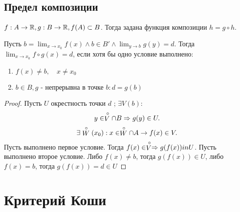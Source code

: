 \documentclass[12pt]{report}
\begin{document}
\subsection{Предел композиции}\label{ques_37}
\begin{defn}
    $f : A \to  \mathbb{R}, g: B \to  \mathbb{R}, f(A) \subset B$. Тогда задана функция композиции $h = g \circ h$.
\end{defn}
\begin{thm}
    Пусть $b = \lim_{x \to x_0} f(x) \wedge b \in  B' \wedge \lim_{y \to  b} g(y) = d $. Тогда $\lim_{x \to  x_0} f \circ g (x)= d$, если хотя бы одно условие выполнено:
    \begin{enumerate}
	\item $f(x) \ne b, \quad x \ne x_0$ 
	\item $b \in  B, g \mbox{ - непрерывна в точке }b: d = g(b)$
    \end{enumerate}
\end{thm}
\begin{proof}
    Пусть $U$ окрестность точки $d$ ; $\exists V(b)$:
    \[
	y \in  \stackrel \circ V \cap B \Rightarrow g(y) \in  U
    .\] 
    \[
	\exists \stackrel \circ W(x_0): x \in  \stackrel \circ W \cap A \to f(x) \in  V
    .\] 
    Пусть выполнено первое условие. Тогда $f(x) \in  \stackrel \circ V \Rightarrow  g(f(x)) in U$.
    Пусть выполнено второе условие. Либо $f(x) \ne b$, тогда $g(f(x)) \in  U$, либо $f(x) = b$, тогда $g(f(x)) = d \in  U$
\end{proof}

\section{Критерий Коши}
\end{document}
